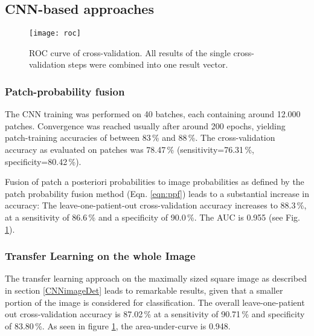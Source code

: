 \documentclass[fleqn,10pt]{wlscirep}
\begin{document}
\subsection{CNN-based approaches}


\begin{figure}
\centering
\texttt{[image: roc]}
\caption{ROC curve of cross-validation. All results of the single
cross-validation steps were combined into one result vector. }
\label{fig:roc}
\end{figure}

\subsubsection*{Patch-probability fusion}



The CNN training was performed on 40 batches, each containing around 12.000
patches. Convergence was reached usually after around 200 epochs, yielding
patch-training accuracies of between 83\,\% and 88\,\%. The cross-validation accuracy as evaluated on patches was 78.47\,\%
(sensitivity=76.31\,\%, specificity=80.42\,\%).



Fusion of patch a posteriori
probabilities to image probabilities as defined by the patch probability fusion method (Eqn. \ref{eqn:ppf}) leads to a
substantial increase in accuracy: The leave-one-patient-out
cross-validation accuracy increases to 88.3\,\%, at a sensitivity of
86.6\,\% and a specificity of 90.0\,\%. The AUC
is 0.955 (see Fig. \ref{fig:roc}).



\subsubsection*{Transfer Learning on the whole Image}

The transfer learning approach on the maximally sized square image as described in section
\ref{CNNimageDet} leads to remarkable results, given that a smaller portion of the image is considered for classification. The overall leave-one-patient out cross-validation accuracy is 87.02\,\% at a sensitivity of 90.71\,\% and specificity of 83.80\,\%. As seen in figure \ref{fig:roc}, the area-under-curve is 0.948.

\vspace{1em}



\vspace{1em}
\end{document}
